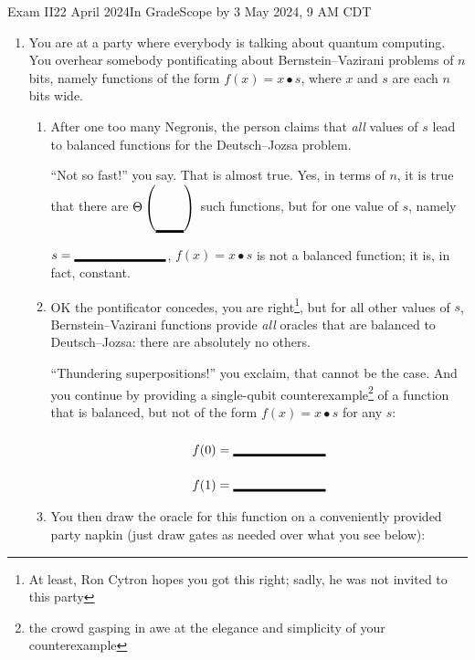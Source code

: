 \documentclass[12pt]{article}
\newcommand{\Blank}[1][1in]{\mbox{\vrule width #1 depth 2pt}\vrule width 0pt height 2.0em}
\begin{document}
\begin{assignment}{Exam II}{22 April 2024}{In GradeScope by 3 May 2024, 9 AM CDT}
\begin{enumerate}
\begin{enumerate}
    \item This is an instance of Grover for a function, where the input values are~\Blank[3em]{} bits wide.
    \item From $\ket{\psi_{f}}$ shown above, what is the secret  (the input value that Grover is trying to find)?~\Blank{}
    \item This is the first step of the \Blank{} iteration of the algorithm.
    \item When we complete this iteration by performing diffusion, the amplitude on  will be approximately \Blank{}, because it increases each iteration on a problem of this size by approximately~\Blank{}.
    
    
\end{enumerate}

\clearpage\item{} You are at a party where everybody is talking about quantum computing.  You overhear somebody pontificating about Bernstein--Vazirani problems of $n$ bits, namely functions of the form
\( f(x) = x \bullet s \),
where $x$ and $s$ are each $n$ bits wide.  

\begin{enumerate}
\item{} After one too many Negronis, the person claims that \emph{all} values of $s$ lead to balanced functions for the Deutsch--Jozsa problem.

``Not so fast!'' you say.  That is almost true.  Yes, in terms of $n$, it is true that there are $\Theta\left(\mbox{\vrule width 0pt height 2em depth 0pt\raisebox{-1.5em}{\Blank[2.2em]}}\right)$ such functions, but for one value of $s$, namely $s=\Blank{}$, $f(x)=x\bullet s$ is not a balanced function; it is, in fact, constant.

\item{} OK the pontificator concedes, you are right\footnote{At least, Ron Cytron hopes you got this right; sadly, he was not invited to this party}, but for all other values of $s$,  Bernstein--Vazirani functions provide \emph{all} oracles that are balanced to Deutsch--Jozsa: there are absolutely no others.

``Thundering superpositions!'' you exclaim, that cannot be the case.  And you continue by providing a single-qubit counterexample\footnote{the crowd gasping in awe at the elegance and simplicity of your counterexample} of a function that is balanced, but not of the form $f(x)=x\bullet s$ for any $s$:
\begin{align*}
    f(0) &= \Blank{} \\
    f(1) &= \Blank{}
\end{align*}
\item{} You then draw the oracle for this function on a conveniently provided party napkin (just draw gates as needed over what you see below):


\end{enumerate}
\end{enumerate}
\end{assignment}
\end{document}
